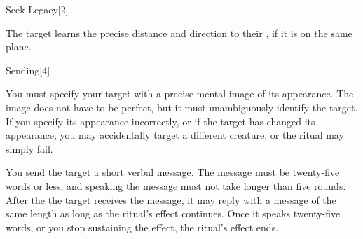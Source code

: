 \begin{spellsection}{Seek Legacy}[2]
\begin{spellcontent}
\begin{spelltargetinginfo}
\end{spelltargetinginfo}
\begin{spelleffects}
\spelleffect
The target learns the precise distance and direction to their , if it is on the same plane.
\end{spelleffects}
\end{spellcontent}
\begin{spellfooter}
\end{spellfooter}
\begin{spellsubcontent}
\end{spellsubcontent}
\end{spellsection}
\begin{spellsection}{Sending}[4]
\begin{spellcontent}
\begin{spelltargetinginfo}
\spellspecial
You must specify your target with a precise mental image of its appearance.
The image does not have to be perfect, but it must unambiguously identify the target.
If you specify its appearance incorrectly, or if the target has changed its appearance, you may accidentally target a different creature, or the ritual may simply fail.
\end{spelltargetinginfo}
\begin{spelleffects}
\spelleffect
You send the target a short verbal message.
The message must be twenty-five words or less, and speaking the message must not take longer than five rounds.
After the the target receives the message, it may reply with a message of the same length as long as the ritual's effect continues.
Once it speaks twenty-five words, or you stop sustaining the effect, the ritual's effect ends.
\end{spelleffects}
\end{spellcontent}
\begin{spellfooter}
\end{spellfooter}
\begin{spellsubcontent}
\end{spellsubcontent}
\end{spellsection}
